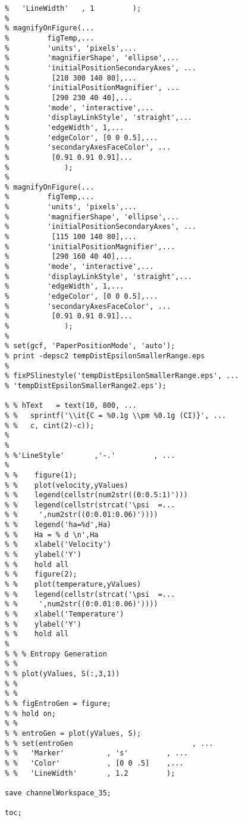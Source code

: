 \begin{lstlisting}
%   'LineWidth'   , 1         );
% 
% magnifyOnFigure(...
%         figTemp,...
%         'units', 'pixels',...
%         'magnifierShape', 'ellipse',...
%         'initialPositionSecondaryAxes', ...
%          [210 300 140 80],...
%         'initialPositionMagnifier', ...
%          [290 230 40 40],...    
%         'mode', 'interactive',...    
%         'displayLinkStyle', 'straight',...        
%         'edgeWidth', 1,...
%         'edgeColor', [0 0 0.5],...
%         'secondaryAxesFaceColor', ...
%          [0.91 0.91 0.91]... 
%             ); 
%         
% magnifyOnFigure(...
%         figTemp,...
%         'units', 'pixels',...
%         'magnifierShape', 'ellipse',...
%         'initialPositionSecondaryAxes', ...
%          [115 100 140 80],...
%         'initialPositionMagnifier',...
%          [290 160 40 40],...    
%         'mode', 'interactive',...    
%         'displayLinkStyle', 'straight',...        
%         'edgeWidth', 1,...
%         'edgeColor', [0 0 0.5],...
%         'secondaryAxesFaceColor', ...
%          [0.91 0.91 0.91]... 
%             ); 
%         
% set(gcf, 'PaperPositionMode', 'auto');
% print -depsc2 tempDistEpsilonSmallerRange.eps
% 
% fixPSlinestyle('tempDistEpsilonSmallerRange.eps', ...
% 'tempDistEpsilonSmallerRange2.eps');
 
% % hText   = text(10, 800, ...
% %   sprintf('\\it{C = %0.1g \\pm %0.1g (CI)}', ...
% %   c, cint(2)-c));
% 
% 
% %'LineStyle'       ,'-.'         , ...
% 
% %    figure(1);
% %    plot(velocity,yValues)
% %    legend(cellstr(num2str((0:0.5:1)')))
% %    legend(cellstr(strcat('\psi  =...
% %     ',num2str((0:0.01:0.06)'))))
% %    legend('ha=%d',Ha)
% %    Ha = % d \n',Ha
% %    xlabel('Velocity')
% %    ylabel('Y')
% %    hold all
% %    figure(2);
% %    plot(temperature,yValues)
% %    legend(cellstr(strcat('\psi  =...
% %     ',num2str((0:0.01:0.06)'))))
% %    xlabel('Temperature')
% %    ylabel('Y')
% %    hold all
% 
% % % Entropy Generation
% % 
% % plot(yValues, S(:,3,1))
% % 
% % 
% % figEntroGen = figure;
% % hold on;
% % 
% % entroGen = plot(yValues, S);
% % set(entroGen                            , ...
% %   'Marker'          , 's'         , ...
% %   'Color'           , [0 0 .5]    ,...
% %   'LineWidth'       , 1.2         );

save channelWorkspace_35;

toc;

\end{lstlisting}

